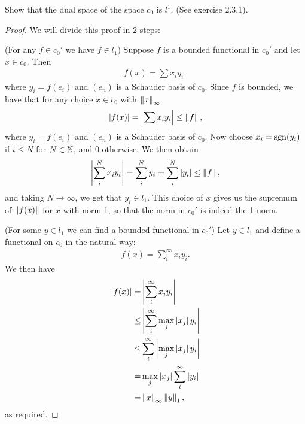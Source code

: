 \begin{exercise}{8}
Show that the dual space of the space $c_0$ is $l^1$. 
(See exercise 2.3.1).
\end{exercise}
\begin{proof}
We will divide this proof in 2 steps:

(For any $f\in c_0'$ we have $f\in l_1$)
Suppose $f$ is a bounded functional in $c_0'$ and let $x\in c_0$.
Then
\begin{align*}
    f(x) = \sum x_iy_i,
\end{align*}
where $y_i=f(e_i)$ and $(e_n)$ is a Schauder basis of $c_0$.
Since $f$ is bounded, we have that for any choice $x\in c_0$ with $\left\lVert x\right\rVert_\infty$
\begin{align*}
    \left\lvert f(x)\right\rvert
    = \left\lvert \sum x_iy_i\right\rvert
    \leq \left\lVert f\right\rVert,
\end{align*}
where $y_i=f(e_i)$ and $(e_n)$ is a Schauder basis of $c_0$.
Now choose $x_i = \operatorname{sgn}(y_i)$ if $i\leq N$ for $N\in \mathbb{N}$, and 0 otherwise.
We then obtain
\begin{align*}
    \left\lvert \sum^N_i x_iy_i\right\rvert
    = \sum^N_i y_i
    = \sum^N_i \left\lvert y_i\right\rvert
    \leq \left\lVert f\right\rVert,
\end{align*}
and taking $N\to\infty$, we get that $y_i\in l_1$.
This choice of $x$ gives us the supremum of $\left\lVert f(x)\right\rVert$ for $x$ with norm 1, so that the norm in $c_0'$ is indeed the 1-norm.

(For some $y\in l_1$ we can find a bounded functional in $c_0'$)
Let $y\in l_1$ and define a functional on $c_0$ in the natural way:
\begin{align*}
    f(x) = \sum^\infty_i x_iy_i.
\end{align*}
We then have
\begin{align*}
    \left\lvert f(x)\right\rvert
    =& \left\lvert \sum^\infty_i x_iy_i\right\rvert\\
    \leq& \left\lvert \sum^\infty_i \max_j \left\lvert x_j\right\rvert y_i\right\rvert\\
    \leq& \sum^\infty_i \left\lvert \max_j \left\lvert x_j\right\rvert y_i\right\rvert\\
    =& \max_j \left\lvert x_j\right\rvert\sum^\infty_i \left\lvert y_i\right\rvert\\
    =& \left\lVert x\right\rVert_\infty\left\lVert y\right\rVert_1,
\end{align*}
as required.
\end{proof}

